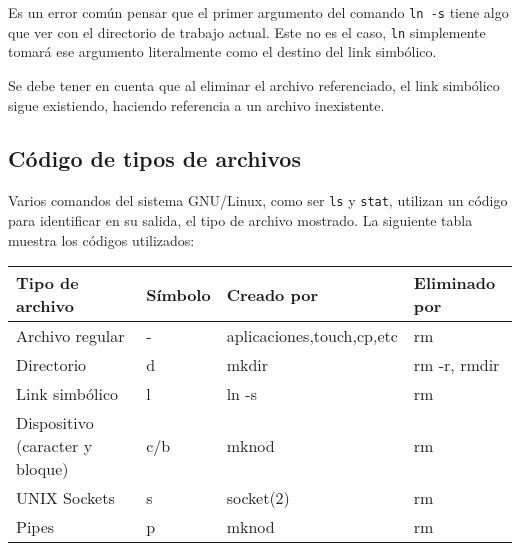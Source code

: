 \documentclass[12pt]{article}
\begin{document}
Es un error común pensar que el primer argumento del comando \texttt{ln -s} tiene algo que 
ver con el directorio de trabajo actual. Este no es el caso, \texttt{ln} simplemente tomará 
ese argumento literalmente como el destino del link simbólico. 

Se debe tener en cuenta que al eliminar el archivo referenciado, el link simbólico sigue existiendo, 
haciendo referencia a un archivo inexistente. 

\subsection*{Código de tipos de archivos}
Varios comandos del sistema GNU/Linux, como ser \texttt{ls} y \texttt{stat}, utilizan un código 
para identificar en su salida, el tipo de archivo mostrado. La siguiente tabla muestra los 
códigos utilizados:

\begin{center}
\begin{tabular}{llll}\hline
\rowcolor{tcA}
Tipo de archivo & Símbolo & Creado por & Eliminado por\\\hline
Archivo regular & - & aplicaciones,touch,cp,etc & rm\\
Directorio & d & mkdir & rm -r, rmdir\\
Link simbólico & l & ln -s & rm \\
Dispositivo (caracter y bloque) & c/b & mknod & rm\\
UNIX Sockets & s & socket(2) & rm\\
Pipes & p & mknod & rm\\\hline
\end{tabular}
\end{center}

\end{document}
